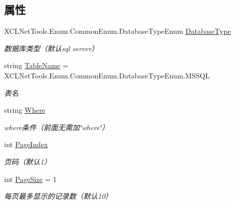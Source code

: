\subsection*{属性}
\begin{DoxyCompactItemize}
\item 
X\+C\+L\+Net\+Tools.\+Enum.\+Common\+Enum.\+Database\+Type\+Enum \hyperlink{class_x_c_l_net_tools_1_1_entity_1_1_sql_pager_condition_entity_a58c76c39c2a5062a6377a3e0a550ec9c}{Database\+Type}
\begin{DoxyCompactList}\small\item\em 数据库类型（默认sql server） \end{DoxyCompactList}\item 
string \hyperlink{class_x_c_l_net_tools_1_1_entity_1_1_sql_pager_condition_entity_ac4a6c5b0eeef5c0ce63cd3aa15c91e15}{Table\+Name} = X\+C\+L\+Net\+Tools.\+Enum.\+Common\+Enum.\+Database\+Type\+Enum.\+M\+S\+S\+QL
\begin{DoxyCompactList}\small\item\em 表名 \end{DoxyCompactList}\item 
string \hyperlink{class_x_c_l_net_tools_1_1_entity_1_1_sql_pager_condition_entity_a0201ec19db112ae1787225c4e03a9b43}{Where}
\begin{DoxyCompactList}\small\item\em where条件（前面无需加\char`\"{}where\char`\"{}） \end{DoxyCompactList}\item 
int \hyperlink{class_x_c_l_net_tools_1_1_entity_1_1_sql_pager_condition_entity_a1550964ce65f83eb6fcc061fef6774a6}{Page\+Index}
\begin{DoxyCompactList}\small\item\em 页码（默认1） \end{DoxyCompactList}\item 
int \hyperlink{class_x_c_l_net_tools_1_1_entity_1_1_sql_pager_condition_entity_aaac0f703651e83bd800ff4e90171300a}{Page\+Size} = 1
\begin{DoxyCompactList}\small\item\em 每页最多显示的记录数（默认10） \end{DoxyCompactList}\item 

\end{DoxyCompactItemize}
